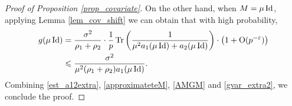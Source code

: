 \begin{proof}[Proof of Proposition \ref{prop_covariate}]
On the other hand, when $M=\mu \operatorname{Id}$, applying Lemma \ref{lem_cov_shift} we can obtain that with high probability,
\begin{align}\label{gvar_extra2}
\begin{split}
g(\mu \operatorname{Id})&= \frac{\sigma^2}{\rho_1+\rho_2}\cdot \frac1p\operatorname{Tr}\left( \frac{1}{\mu^2 a_1 (\mu\operatorname{Id}) + a_2(\mu\operatorname{Id})}\right) \cdot \left(1 +\operatorname{O}(p^{-{\varepsilon}})\right)\\
&\leqslant \frac{\sigma^2}{\mu^2(\rho_1+\rho_2)a_1 (\mu\operatorname{Id})}.
\end{split}
\end{align}
Combining \eqref{est_a12extra}, \eqref{approximateteM}, \eqref{AMGM} and \eqref{gvar_extra2}, we conclude the proof.
\end{proof}

